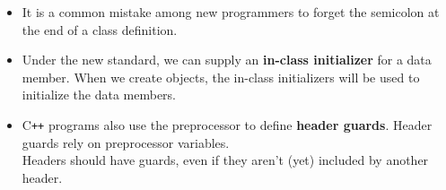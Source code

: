 \begin{itemize}
\item
It is a common mistake among new programmers to forget the semicolon at the end of a class definition.

\item
Under the new standard, we can supply an \textbf{in-class initializer} for a data member. When we create objects, the in-class initializers will be used to initialize the data members.

\item
C\texttt{++} programs also use the preprocessor to define \textbf{header guards}. Header guards rely on preprocessor variables.\\
Headers should have guards, even if they aren't (yet) included by another header.

\end{itemize}